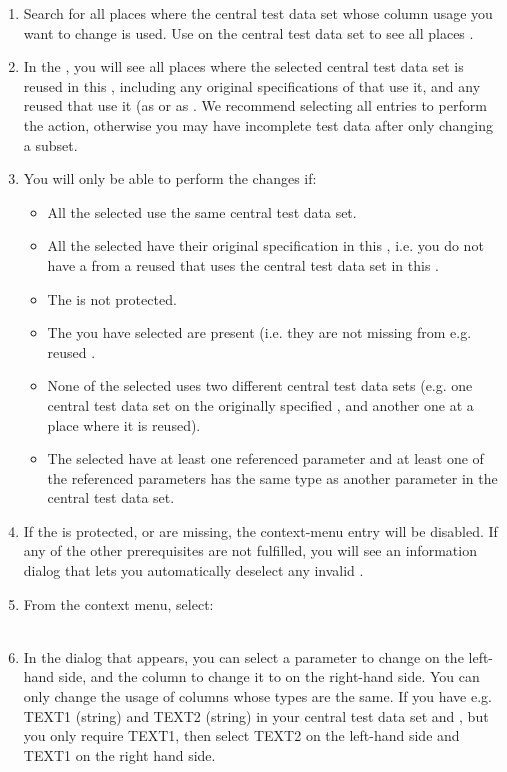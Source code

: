 \begin{enumerate}
\item Search for all places where the central test data set whose column usage you want to change is used. Use  on the central test data set to see all places . 
\item In the \gdsearchresultview{}, you will see all places where the selected central test data set is reused in this \gdproject{}, including any original specifications of \gdcases{} that use it, and any reused \gdcases{} that use it (as \gdcases{} or as \gdehandlers{}. We recommend selecting all entries to perform the action, otherwise you may have incomplete test data after only changing a subset. 
\item You will only be able to perform the changes if:
\begin{itemize}
\item All the selected \gdcases{} use the same central test data set.
\item All the selected \gdcases{} have their original specification in this \gdproject{}, i.e. you do not have a \gdcase{} from a reused \gdproject{} that uses the central test data set in this \gdproject{}.
\item The \gdproject{} is not protected.
\item The \gdcases{} you have selected are present (i.e. they are not missing from e.g. reused \gdprojects{}. 
\item None of the selected \gdcases{} uses two different central test data sets (e.g. one central test data set on the originally specified \gdcase{}, and another one at a place where it is reused).
\item The selected \gdcases{} have at least one referenced parameter and at least one of the referenced parameters has the same type as another parameter in the central test data set.
\end{itemize}
\item If the \gdproject{} is protected, or \gdcases{} are missing, the context-menu entry will be disabled. If any of the other prerequisites are not fulfilled, you will see an information dialog that lets you automatically deselect any invalid \gdcases{}. 
\item From the context menu, select:\\
\\
\item In the dialog that appears, you can select a parameter to change on the left-hand side, and the column to change it to on the right-hand side. You can only change the usage of columns whose types are the same. If you have e.g. TEXT1 (string) and TEXT2 (string)  in your central test data set and \gdcases{}, but you only require TEXT1, then select TEXT2 on the left-hand side and TEXT1 on the right hand side.

\end{enumerate}
